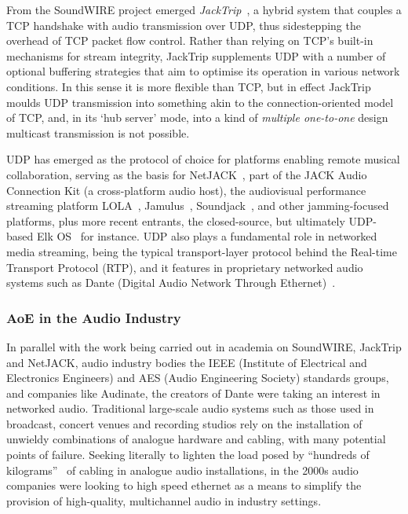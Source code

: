 \documentclass[utf8]{FrontiersinHarvard}
\begin{document}
    From the SoundWIRE project emerged \textit{JackTrip}~\citep{
        caceres_jacktrip_2010,caceres_jacktripsoundwire_2010}, a hybrid system
    that couples a TCP handshake with audio transmission over UDP, thus
    sidestepping the overhead of TCP packet flow control.
    Rather than relying on TCP's built-in mechanisms for stream integrity,
    JackTrip supplements UDP with a number of optional buffering strategies that
    aim to optimise its operation in various network conditions.
    In this sense it is more flexible than TCP, but in effect JackTrip moulds
    UDP transmission into something akin to the connection-oriented model of
    TCP, and, in its `hub server' mode, into a kind of
    \textit{multiple one-to-one} design \textemdash{} multicast transmission is
    not possible.

    UDP has emerged as the protocol of choice for platforms enabling remote
    musical collaboration, serving as the basis for
    NetJACK~\citep{carot_netjack_2009}, part of the JACK Audio Connection Kit (a
    cross-platform audio host), the audiovisual performance streaming platform
    LOLA~\citep{drioli_networked_2013}, Jamulus~\citep{fischer_case_2015},
    Soundjack~\citep{renaud_networked_2007}, and other jamming-focused
    platforms, plus more recent entrants, the closed-source, but ultimately
    UDP-based Elk OS~\citep{turchet_elk_2021} for instance.
    UDP also plays a fundamental role in networked media streaming, being the
    typical transport-layer protocol behind the Real-time Transport Protocol
    (RTP), and it features in proprietary networked audio systems such as Dante
    (Digital Audio Network Through Ethernet)~\citep{dante_what_2022}.

    \subsubsection{AoE in the Audio Industry}

    In parallel with the work being carried out in academia on SoundWIRE, JackTrip
    and NetJACK, audio industry bodies \textemdash{} the IEEE (Institute of
    Electrical and Electronics Engineers) and AES (Audio Engineering Society)
    standards groups, and companies like Audinate, the creators of Dante
    \textemdash{} were taking an interest in networked audio.
    Traditional large-scale audio systems such as those used in broadcast, concert
    venues and recording studios rely on the installation of unwieldy combinations
    of analogue hardware and cabling, with many potential points of failure.
    Seeking literally to lighten the load posed by ``hundreds of
    kilograms''~\citep{bakker_introduction_2014} of cabling in analogue audio
    installations, in the 2000s audio companies were looking to high speed ethernet
    as a means to simplify the provision of high-quality, multichannel audio in
    industry settings.
\end{document}
